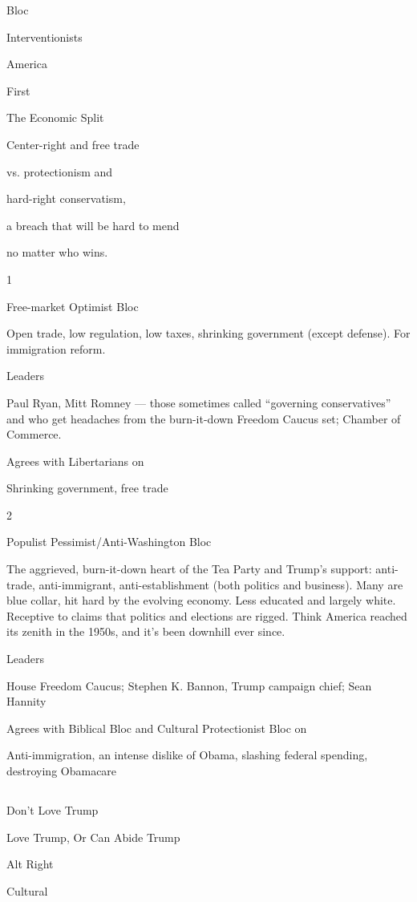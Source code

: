 Bloc

Interventionists

America

First

The Economic Split

Center-right and free trade

vs. protectionism and

hard-right conservatism,

a breach that will be hard to mend

no matter who wins.

1

Free-market Optimist Bloc

Open trade, low regulation, low taxes, shrinking government (except
defense). For immigration reform.

Leaders

Paul Ryan, Mitt Romney --- those sometimes called ``governing
conservatives'' and who get headaches from the burn-it-down Freedom
Caucus set; Chamber of Commerce.

Agrees with Libertarians on

Shrinking government, free trade

2

Populist Pessimist/Anti-Washington Bloc

The aggrieved, burn-it-down heart of the Tea Party and Trump's support:
anti-trade, anti-immigrant, anti-establishment (both politics and
business). Many are blue collar, hit hard by the evolving economy. Less
educated and largely white. Receptive to claims that politics and
elections are rigged. Think America reached its zenith in the 1950s, and
it's been downhill ever since.

Leaders

House Freedom Caucus; Stephen K. Bannon, Trump campaign chief; Sean
Hannity

Agrees with Biblical Bloc and Cultural Protectionist Bloc on

Anti-immigration, an intense dislike of Obama, slashing federal
spending, destroying Obamacare

\subsection{}

Don't Love Trump

Love Trump, Or Can Abide Trump

Alt Right

Cultural


